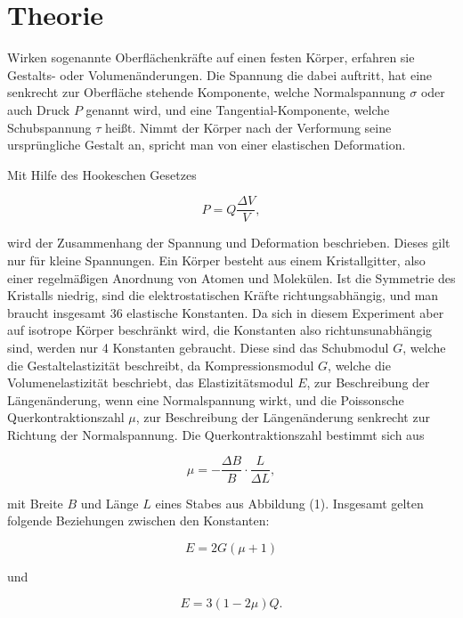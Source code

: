 \section{Theorie}
\label{sec:Theorie}



Wirken sogenannte Oberflächenkräfte auf einen festen Körper,
erfahren sie Gestalts- oder Volumenänderungen. Die Spannung
die dabei auftritt, hat eine senkrecht zur Oberfläche stehende Komponente, welche
Normalspannung $\sigma$ oder auch Druck $P$ genannt wird, und
eine Tangential-Komponente, welche Schubspannung $\tau$ heißt.
Nimmt der Körper nach der Verformung seine ursprüngliche Gestalt an, spricht
man von einer elastischen Deformation. 

Mit Hilfe des Hookeschen Gesetzes

\begin{equation}
  P = Q \frac{\Delta V}{V} ,
\end{equation}


wird der Zusammenhang  der Spannung und Deformation beschrieben.
Dieses gilt nur für kleine Spannungen. 
Ein Körper besteht aus einem Kristallgitter, also einer regelmäßigen Anordnung von Atomen und Molekülen.
Ist die Symmetrie des Kristalls niedrig, sind die elektrostatischen Kräfte richtungsabhängig, und man braucht insgesamt 36 elastische Konstanten.
Da sich in diesem Experiment aber auf isotrope Körper beschränkt wird, die Konstanten also richtunsunabhängig sind, werden nur 4 Konstanten gebraucht.
Diese sind das Schubmodul $G$, welche die Gestaltelastizität beschreibt,
da Kompressionsmodul $G$, welche die Volumenelastizität beschriebt, das Elastizitätsmodul $E$, zur 
Beschreibung der Längenänderung, wenn eine Normalspannung wirkt, und die Poissonsche Querkontraktionszahl $\mu$, zur Beschreibung der 
Längenänderung senkrecht zur Richtung der Normalspannung.
Die Querkontraktionszahl bestimmt sich aus

\begin{equation}
  \mu = - \frac{\Delta B}{B}\cdot \frac{L}{\Delta L} ,
\end{equation}

mit Breite $B$ und Länge $L$ eines Stabes aus Abbildung (1).
Insgesamt gelten folgende Beziehungen zwischen den Konstanten:

\begin{equation}
  E = 2G(\mu + 1) 
\end{equation}

und

\begin{equation}
  E = 3 (1-2\mu)Q .
\end{equation}


